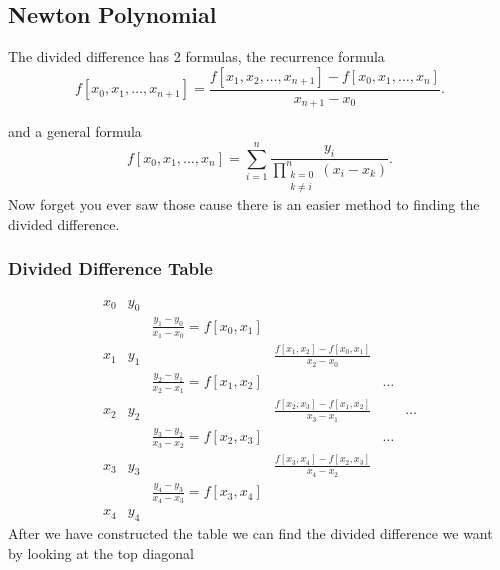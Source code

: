 \documentclass{report}
\begin{document}
\subsection{Newton Polynomial}



The divided difference has 2 formulas, the recurrence formula
\[
	f[x_0,x_1,\dots,x_{n+1}] = \frac{f[x_1,x_2,\dots,x_{n+1}]-f[x_0,x_1,\dots,x_{n}]}{x_{n+1}-x_0}
	.\]

and a general formula
\[
	f[x_0,x_1,\dots,x_n] = \sum_{i=1}^{n}\frac{y_i }{\prod_{\substack{k=0\\k\neq i}}^{n} (x_i - x_k)}
	.\]
Now forget you ever saw those cause there is an easier method to finding the divided difference.

\subsubsection{Divided Difference Table}
\[
	\begin{array}{cccccc}
		x_0 & y_0                                                                                              \\
		    &     & \frac{y_1-y_0}{x_1-x_0}=f[x_0,x_1]                                                         \\
		x_1 & y_1 &                                    & \frac{f[x_1,x_2]-f[x_0,x_1]}{x_2-x_0}                 \\
		    &     & \frac{y_2-y_1}{x_2-x_1}=f[x_1,x_2] &                                       & \dots         \\
		x_2 & y_2 &                                    & \frac{f[x_2,x_3]-f[x_1,x_2]}{x_3-x_1} &       & \dots \\
		    &     & \frac{y_3-y_2}{x_3-x_2}=f[x_2,x_3] &                                       & \dots         \\
		x_3 & y_3 &                                    & \frac{f[x_3,x_4]-f[x_2,x_3]}{x_4-x_2}                 \\
		    &     & \frac{y_4-y_3}{x_4-x_3}=f[x_3,x_4]                                                         \\
		x_4 & y_4
	\end{array}
\]
After we have constructed the table we can find the divided difference we want by looking at the top diagonal
\end{document}
